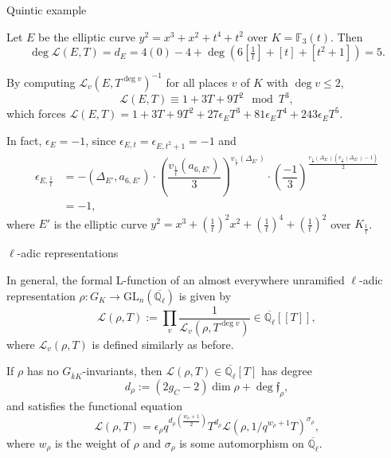 \documentclass[10pt]{beamer}
\begin{document}
\begin{frame}[t]{Quintic example}

Let $ E $ be the elliptic curve $ y^2 = x^3 + x^2 + t^4 + t^2 $ over $ K = \mathbb{F}_3(t) $. \pause Then
$$ \deg\mathcal{L}(E, T) = d_E = 4(0) - 4 + \deg(6[\tfrac{1}{t}] + [t] + [t^2 + 1]) = 5. $$

\pause

By computing $ \mathcal{L}_v(E, T^{\deg v})^{-1} $ for all places $ v $ of $ K $ with $ \deg v \le 2 $,
$$ \mathcal{L}(E, T) \equiv 1 + 3T + 9T^2 \mod T^3, $$
which forces $ \mathcal{L}(E, T) = 1 + 3T + 9T^2 + 27\epsilon_ET^3 + 81\epsilon_ET^4 + 243\epsilon_ET^5 $.

\pause

\vspace{0.5cm} In fact, $ \epsilon_E = -1 $, since $ \epsilon_{E, t} = \epsilon_{E, t^2 + 1} = -1 $ and
\begin{align*}
\epsilon_{E, \frac{1}{t}}
& = -(\Delta_{E'}, a_{6, E'}) \cdot \left(\dfrac{v_{\frac{1}{t}}(a_{6, E'})}{3}\right)^{v_{\frac{1}{t}}(\Delta_{E'})} \cdot \left(\dfrac{-1}{3}\right)^{\tfrac{v_{\frac{1}{t}}(\Delta_{E'})(v_{\frac{1}{t}}(\Delta_{E'}) - 1)}{2}} \\
& = -1,
\end{align*}
where $ E' $ is the elliptic curve $ y^2 = x^3 + (\tfrac{1}{t})^2x^2 + (\tfrac{1}{t})^4 + (\tfrac{1}{t})^2 $ over $ K_{\frac{1}{t}} $.

\end{frame}

\begin{frame}[t]{$ \ell $-adic representations}

In general, the formal L-function of an almost everywhere unramified $ \ell $-adic representation $ \rho : G_K \to \mathrm{GL}_n(\overline{\mathbb{Q}_\ell}) $ is given by
$$ \mathcal{L}(\rho, T) := \prod_v \dfrac{1}{\mathcal{L}_v(\rho, T^{\deg v})} \in \overline{\mathbb{Q}_\ell}[[T]], $$
where $ \mathcal{L}_v(\rho, T) $ is defined similarly as before.

\pause

\begin{corollary}
If $ \rho $ has no $ G_{\overline{k}K} $-invariants, then $ \mathcal{L}(\rho, T) \in \overline{\mathbb{Q}_\ell}[T] $ has degree
$$ d_\rho := (2g_C - 2)\dim\rho + \deg\mathfrak{f}_\rho, $$
and satisfies the functional equation
$$ \mathcal{L}(\rho, T) = \epsilon_\rho q^{d_\rho(\tfrac{w_\rho + 1}{2})}T^{d_\rho}\mathcal{L}(\rho, 1 / q^{w_\rho + 1}T)^{\sigma_\rho}, $$
where $ w_\rho $ is the weight of $ \rho $ and $ \sigma_\rho $ is some automorphism on $ \overline{\mathbb{Q}_\ell} $.
\end{corollary}

\end{frame}
\end{document}
